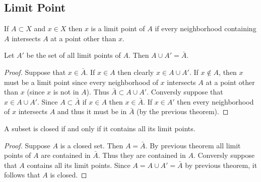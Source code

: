 \subsection{Limit Point}
\begin{definition}
  If $A\subset X$ and $x\in X$ then $x$ is a limit point of $A$ if every neighborhood containing $A$ intersects $A$ at a point other than $x$.
\end{definition}
\begin{theorem}
  Let $A'$ be the set of all limit points of $A$. Then $A\cup A' = \bar{A}$.
\end{theorem}
\begin{proof}
  Suppose that $x\in \bar{A}$. If $x\in A$ then clearly $x\in A\cup A'$. If $x\notin A$, then $x$ must be a limit point since every neighborhood of $x$ intersects $A$ at a point other than $x$ (since $x$ is not in $A$). Thus $\bar{A} \subset A\cup A'$. Conversly suppose that $x\in A\cup A'$. Since $A\subset \bar{A}$ if $x\in A$ then $x\in \bar{A}$. If $x\in A'$ then every neighborhood of $x$ intersects $A$ and thus it must be in $\bar{A}$ (by the previous theorem). 
\end{proof}
\begin{theorem}
  A subset is closed if and only if it contains all its limit points. 
\end{theorem}
\begin{proof}
  Suppose $A$ is a closed set. Then $A = \bar{A}$. By previous theorem all limit points of $A$ are contained in $\bar{A}$. Thus they are contained in $A$. Conversly suppose that $A$ contains all its limit points. Since $A = A\cup A' = \bar{A}$ by previous theorem, it follows that $A$ is closed.
\end{proof}
